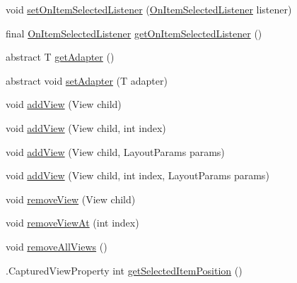 \begin{DoxyCompactItemize}
void \hyperlink{classit_1_1sephiroth_1_1android_1_1library_1_1widget_1_1_adapter_view_ae0527cc6125c98b73dfb4a887fb0d94e}{set\+On\+Item\+Selected\+Listener} (\hyperlink{interfaceit_1_1sephiroth_1_1android_1_1library_1_1widget_1_1_adapter_view_1_1_on_item_selected_listener}{On\+Item\+Selected\+Listener} listener)
\item 
final \hyperlink{interfaceit_1_1sephiroth_1_1android_1_1library_1_1widget_1_1_adapter_view_1_1_on_item_selected_listener}{On\+Item\+Selected\+Listener} \hyperlink{classit_1_1sephiroth_1_1android_1_1library_1_1widget_1_1_adapter_view_afb9e4909cf452262c55bcd2d622a1649}{get\+On\+Item\+Selected\+Listener} ()
\item 
abstract T \hyperlink{classit_1_1sephiroth_1_1android_1_1library_1_1widget_1_1_adapter_view_afb79f607af696fd557a668a935185eb4}{get\+Adapter} ()
\item 
abstract void \hyperlink{classit_1_1sephiroth_1_1android_1_1library_1_1widget_1_1_adapter_view_a026028e91fb7bb6711b05d90caf6727f}{set\+Adapter} (T adapter)
\item 
void \hyperlink{classit_1_1sephiroth_1_1android_1_1library_1_1widget_1_1_adapter_view_ab2a05b66bf7ed51980f3738fe53e8c36}{add\+View} (View child)
\item 
void \hyperlink{classit_1_1sephiroth_1_1android_1_1library_1_1widget_1_1_adapter_view_a4e5185b3f47477aaab50e47d757e71a4}{add\+View} (View child, int index)
\item 
void \hyperlink{classit_1_1sephiroth_1_1android_1_1library_1_1widget_1_1_adapter_view_a7088eb54eac7c57d0eefd94f0852a80c}{add\+View} (View child, Layout\+Params params)
\item 
void \hyperlink{classit_1_1sephiroth_1_1android_1_1library_1_1widget_1_1_adapter_view_a81a917d0f9d84e2d1efa5ff1029c1d36}{add\+View} (View child, int index, Layout\+Params params)
\item 
void \hyperlink{classit_1_1sephiroth_1_1android_1_1library_1_1widget_1_1_adapter_view_a2007337f04dbacb625fccfaa4d96457c}{remove\+View} (View child)
\item 
void \hyperlink{classit_1_1sephiroth_1_1android_1_1library_1_1widget_1_1_adapter_view_addce723da9788dd4532b9b3a7135fe62}{remove\+View\+At} (int index)
\item 
void \hyperlink{classit_1_1sephiroth_1_1android_1_1library_1_1widget_1_1_adapter_view_a8065d24d5039a00638dd99236d5a1762}{remove\+All\+Views} ()
\item 
.Captured\+View\+Property int \hyperlink{classit_1_1sephiroth_1_1android_1_1library_1_1widget_1_1_adapter_view_abf31ea6d2bfb290c21ccaba39b1fa41d}{get\+Selected\+Item\+Position} ()

\end{DoxyCompactItemize}
